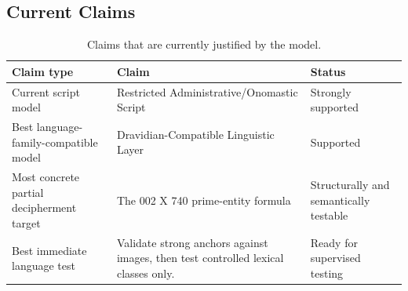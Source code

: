 \subsection{Current Claims}

\begin{table}[htbp]
\centering
\footnotesize
\begin{tabular}{p{}p{}p{}}
\toprule
\textbf{Claim type} & \textbf{Claim} & \textbf{Status} \\
\midrule
Current script model & Restricted Administrative/Onomastic Script & Strongly supported \\
Best language-family-compatible model & Dravidian-Compatible Linguistic Layer & Supported \\
Most concrete partial decipherment target & The 002 X 740 prime-entity formula & Structurally and semantically testable \\
Best immediate language test & Validate strong anchors against images, then test controlled lexical classes only. & Ready for supervised testing \\
\bottomrule
\end{tabular}
\caption{Claims that are currently justified by the model.}
\end{table}
